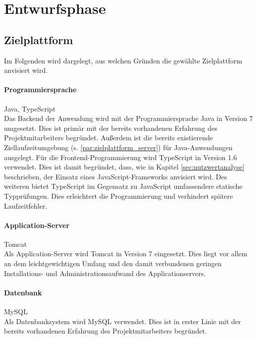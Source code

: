 \documentclass[12pt, xcolor=dvipsnames]{scrartcl}
\begin{document}
\section{Entwurfsphase}

\subsection{Zielplattform}

Im Folgenden wird dargelegt, aus welchen Gründen die gewählte Zielplattform anvisiert wird.

\paragraph{Programmiersprache} Java, TypeScript \\
Das Backend der Anwendung wird mit der Programmiersprache Java in Version 7 umgesetzt.
Dies ist primär mit der bereits vorhandenen Erfahrung des Projektmitarbeiters begründet. Außerdem ist die bereits existierende Ziellaufzeitumgebung (s. \ref{par:zielplattform_server}) für Java-Anwendungen ausgelegt.
Für die Frontend-Programmierung wird TypeScript in Version 1.6 verwendet. Dies ist damit begründet, dass, wie in Kapitel \ref{sec:nutzwertanalyse} beschrieben, der Einsatz eines JavaScript-Frameworks anvisiert wird. Des weiteren bietet TypeScript im Gegensatz zu JavaScript umfassendere statische Typprüfungen. Dies erleichtert die Programmierung und verhindert spätere Laufzeitfehler.

\paragraph{Application-Server} Tomcat \\
Als Application-Server wird Tomcat in Version 7 eingesetzt. Dies liegt vor allem an dem leichtgewichtigen Umfang und den damit verbundenen geringen Installations- und Administrationsaufwand des Applicationservers. 

\paragraph{Datenbank} MySQL \\
Als Datenbanksystem wird MySQL verwendet. Dies ist in erster Linie mit der bereits vorhandenen Erfahrung des Projektmitarbeiters begründet.
\end{document}
